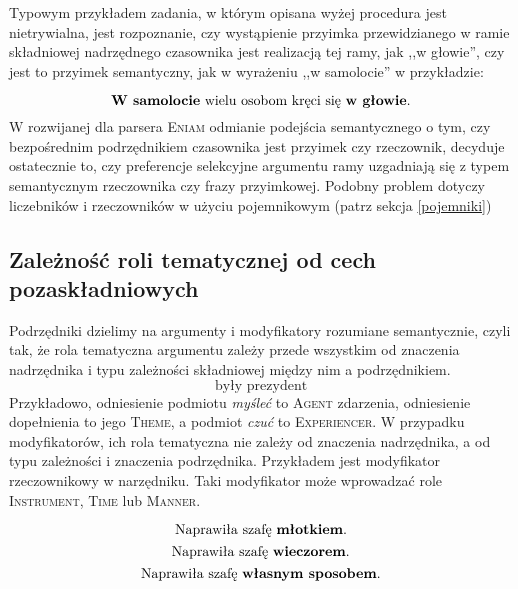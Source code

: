 \documentclass[a4paper, 12pt]{article}
\theoremstyle{remark}
\newcommand{\eniam}{\textsc{Eniam}}
\newcommand{\experiencer}{\textsc{Experiencer}}
\newcommand{\agent}{\textsc{Agent}}
\newcommand{\theme}{\textsc{Theme}}
\begin{document}
Typowym przykładem zadania, w którym opisana wyżej procedura jest nietrywialna, jest rozpoznanie, czy wystąpienie przyimka przewidzianego w ramie składniowej nadrzędnego czasownika jest realizacją tej ramy, jak ,,w głowie'', czy jest to przyimek semantyczny, jak w wyrażeniu ,,w samolocie'' w przykładzie:

\begin{equation}
	\text{\textbf{W samolocie} wielu osobom kręci się \textbf{w głowie}.}
\end{equation}
W rozwijanej dla parsera \eniam{} odmianie podejścia semantycznego
o tym, czy bezpośrednim podrzędnikiem czasownika jest przyimek czy rzeczownik,
decyduje ostatecznie to, czy preferencje selekcyjne argumentu ramy uzgadniają się z typem semantycznym rzeczownika czy frazy przyimkowej.
Podobny problem dotyczy liczebników i rzeczowników w użyciu pojemnikowym (patrz sekcja \ref{pojemniki})

\subsection{Zależność roli tematycznej od cech pozaskładniowych}

Podrzędniki dzielimy na argumenty i modyfikatory rozumiane semantycznie, czyli tak, że rola tematyczna argumentu zależy przede wszystkim od znaczenia nadrzędnika i typu zależności składniowej między nim a podrzędnikiem.
\begin{equation}
	\text{były prezydent}
\end{equation}
Przykładowo, odniesienie podmiotu \emph{myśleć} to \agent{} zdarzenia, odniesienie dopełnienia to jego \theme, a podmiot \emph{czuć} to \experiencer. 
W przypadku modyfikatorów, ich rola tematyczna nie zależy od znaczenia nadrzędnika, a od typu zależności i znaczenia podrzędnika.
Przykładem jest modyfikator rzeczownikowy w narzędniku. Taki modyfikator może wprowadzać role \textsc{Instrument}, \textsc{Time} lub \textsc{Manner}.

\begin{equation}
	\text{Naprawiła szafę \textbf{młotkiem}.} 
\end{equation}
\begin{equation}
	\text{Naprawiła szafę \textbf{wieczorem}.} 
\end{equation}
\begin{equation}
	\text{Naprawiła szafę \textbf{własnym sposobem}.} 
\end{equation}
\end{document}
